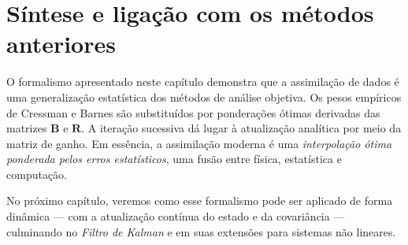 \section{Síntese e ligação com os métodos anteriores}
O formalismo apresentado neste capítulo demonstra que a assimilação de dados é uma generalização estatística dos métodos de análise objetiva.  
Os pesos empíricos de Cressman e Barnes são substituídos por ponderações ótimas derivadas das matrizes $\mathbf{B}$ e $\mathbf{R}$.  
A iteração sucessiva dá lugar à atualização analítica por meio da matriz de ganho.  
Em essência, a assimilação moderna é uma \emph{interpolação ótima ponderada pelos erros estatísticos}, uma fusão entre física, estatística e computação.

No próximo capítulo, veremos como esse formalismo pode ser aplicado de forma dinâmica — com a atualização contínua do estado e da covariância — culminando no \emph{Filtro de Kalman} e em suas extensões para sistemas não lineares.

